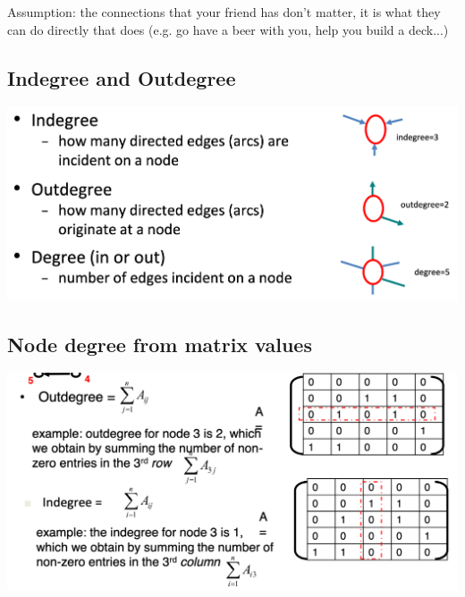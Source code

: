 \documentclass[11pt]{article}
\theoremstyle{definition}
\begin{document}
Assumption: the connections that your friend has don't matter, it is what they
can do directly that does (e.g. go have a beer with you, help you build a
deck...)

\subsection{Indegree and Outdegree}
\includegraphics[width=\textwidth/2]{14.png}

\subsection{Node degree from matrix values}
\includegraphics[width=\textwidth/2]{15.png}
\end{document}
